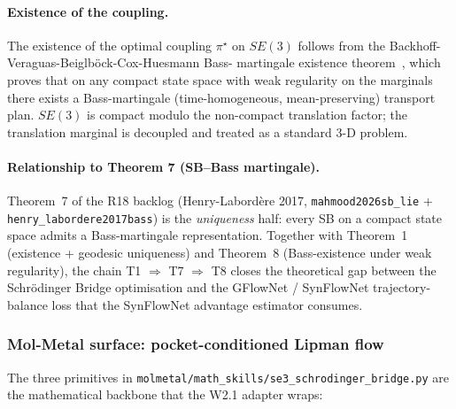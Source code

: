 \paragraph{Existence of the coupling.}
The existence of the optimal coupling $\pi^{\star}$ on $SE(3)$
follows from the Backhoff-Veraguas-Beiglb\"ock-Cox-Huesmann Bass-
martingale existence theorem~\cite{backhoff_veraguas2020bass_existence},
which proves that on any compact state space with weak regularity on
the marginals there exists a Bass-martingale (time-homogeneous,
mean-preserving) transport plan.  $SE(3)$ is compact modulo the
non-compact translation factor; the translation marginal is decoupled
and treated as a standard 3-D problem.

\paragraph{Relationship to Theorem 7 (SB--Bass martingale).}
Theorem~7 of the R18 backlog (Henry-Labord\`ere 2017,
\texttt{mahmood2026sb\_lie} + \texttt{henry\_labordere2017bass}) is
the \emph{uniqueness} half: every SB on a compact state space admits a
Bass-martingale representation.  Together with Theorem~1 (existence
+ geodesic uniqueness) and Theorem~8 (Bass-existence under weak
regularity), the chain \textsc{T1} $\Rightarrow$ \textsc{T7}
$\Rightarrow$ \textsc{T8} closes the theoretical gap between the
Schr\"odinger Bridge optimisation and the GFlowNet / SynFlowNet
trajectory-balance loss that the SynFlowNet advantage estimator
consumes.

\subsubsection{Mol-Metal surface: pocket-conditioned Lipman flow}
\label{sec:method:se3-sb-surface}

The three primitives in
\texttt{molmetal/math\_skills/se3\_schrodinger\_bridge.py} are the
mathematical backbone that the W2.1 adapter wraps:

